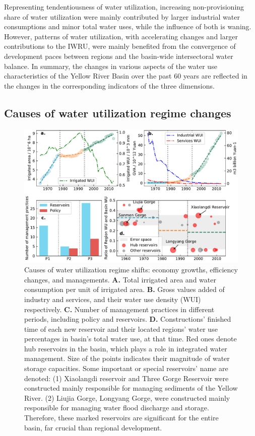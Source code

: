 \documentclass[9pt, twocolumn, twoside, lineno]{pnas-new}
\begin{document}
Representing tendentiousness of water utilization, 
increasing non-provisioning share of water utilization were mainly contributed by larger industrial water consumptions and minor total water uses, 
while the influence of both is waning.
However, patterns of water utilization, with accelerating changes and larger contributions to the IWRU, 
were mainly benefited from the convergence of development paces between regions and the basin-wide intersectoral water balance.
In summary, the changes in various aspects of the water use characteristics of the Yellow River Basin over the past 60 years 
are reflected in the changes in the corresponding indicators of the three dimensions.

\subsection*{Causes of water utilization regime changes}

\begin{figure}%
	\centering
	\includegraphics[width=\linewidth]{../../figures/main_text/causes.pdf}
	\caption{
		Causes of water utilization regime shifts: economy growths, efficiency changes, and managements.
		\textbf{A.} Total irrigated area and water consumption per unit of irrigated area.
		\textbf{B.} Gross values added of industry and services, and their water use density (WUI) respectively.
		\textbf{C.} Number of management practices in different periods, including policy and reservoirs.
		\textbf{D.} Constructions' finished time of each new reservoir and their located regions' water use percentages in basin's total water use, at that time. Red ones denote hub reservoirs in the basin, which plays a role in integrated water management. Size of the points indicates their magnitude of water storage capacities. Some important or special reservoirs' name are denoted: (1) Xiaolangdi reservoir and Three Gorge Reservoir were constructed mainly responsible for managing sediments of the Yellow River. (2) Liujia Gorge, Longyang Gorge, were constructed mainly responsible for managing water flood discharge and storage. Therefore, these marked reservoirs are significant for the entire basin, far crucial than regional development.
	}
	\label{fig:Causes}
\end{figure}
\end{document}
